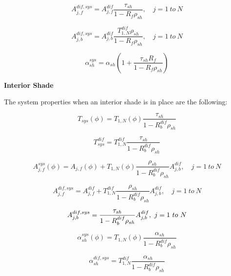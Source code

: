 \begin{equation}
A_{j,f}^{dif,sys} = A_{j,f}^{dif}\frac{{{\tau_{sh}}}}{{1 - {R_f}{\rho_{sh}}}},\quad j = 1~to~N
\end{equation}

\begin{equation}
A_{j,b}^{dif,sys} = A_{j,b}^{dif}\frac{{T_{1,N}^{dif}{\rho_{sh}}}}{{1 - {R_f}{\rho_{sh}}}},\quad j = 1~to~N
\end{equation}

\begin{equation}
\alpha_{sh}^{sys} = {\alpha_{sh}}\left( {1 + \frac{{{\tau_{sh}}{R_f}}}{{1 - {R_f}{\rho_{sh}}}}} \right)
\end{equation}

\textbf{Interior Shade}

The system properties when an interior shade is in place are the following:

\begin{equation}
{T_{sys}}(\phi ) = T_{1,N}^{}(\phi )\frac{{{\tau_{sh}}}}{{1 - R_b^{dif}{\rho_{sh}}}}
\end{equation}

\begin{equation}
T_{sys}^{dif} = T_{1,N}^{dif}\frac{{{\tau_{sh}}}}{{1 - R_b^{dif}{\rho_{sh}}}}
\end{equation}

\begin{equation}
A_{j,f}^{sys}(\phi ) = {A_{j,f}}(\phi ) + {T_{1,N}}(\phi )\frac{{{\rho_{sh}}}}{{1 - R_b^{dif}{\rho_{sh}}}}A_{j,b}^{dif},\quad j = 1~to~N
\end{equation}

\begin{equation}
A_{j,f}^{dif,sys} = A_{j,f}^{dif} + T_{1,N}^{dif}\frac{{{\rho_{sh}}}}{{1 - R_b^{dif}{\rho_{sh}}}}A_{j,b}^{dif},\quad j = 1~to~N
\end{equation}

\begin{equation}
A_{j,b}^{dif,sys} = \frac{{{\tau_{sh}}}}{{1 - R_b^{dif}{\rho_{sh}}}}A_{j,b}^{dif},{\rm{    }}~j = 1~to~N
\end{equation}

\begin{equation}
\alpha_{sh}^{sys}(\phi ) = T_{1,N}^{}(\phi )\frac{{{\alpha_{sh}}}}{{1 - R_b^{dif}{\rho_{sh}}}}
\end{equation}

\begin{equation}
\alpha_{sh}^{dif,sys} = T_{1,N}^{dif}\frac{{{\alpha_{sh}}}}{{1 - R_b^{dif}{\rho_{sh}}}}
\end{equation}

